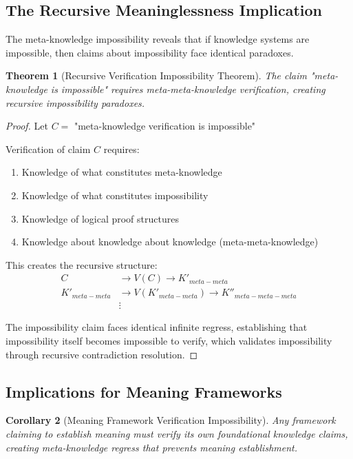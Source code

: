 \documentclass[12pt,a4paper]{article}
\newtheorem{theorem}{Theorem}[section]
\newtheorem{corollary}[theorem]{Corollary}
\begin{document}
\subsection{The Recursive Meaninglessness Implication}

The meta-knowledge impossibility reveals that if knowledge systems are impossible, then claims about impossibility face identical paradoxes.

\begin{theorem}[Recursive Verification Impossibility Theorem]
The claim "meta-knowledge is impossible" requires meta-meta-knowledge verification, creating recursive impossibility paradoxes.
\end{theorem}

\begin{proof}
Let $C =$ "meta-knowledge verification is impossible"

Verification of claim $C$ requires:
\begin{enumerate}
\item Knowledge of what constitutes meta-knowledge
\item Knowledge of what constitutes impossibility
\item Knowledge of logical proof structures
\item Knowledge about knowledge about knowledge (meta-meta-knowledge)
\end{enumerate}

This creates the recursive structure:
\begin{align}
C &\rightarrow V(C) \rightarrow K'_{meta-meta} \\
K'_{meta-meta} &\rightarrow V(K'_{meta-meta}) \rightarrow K''_{meta-meta-meta} \\
&\vdots
\end{align}

The impossibility claim faces identical infinite regress, establishing that impossibility itself becomes impossible to verify, which validates impossibility through recursive contradiction resolution.
\end{proof}

\subsection{Implications for Meaning Frameworks}

\begin{corollary}[Meaning Framework Verification Impossibility]
Any framework claiming to establish meaning must verify its own foundational knowledge claims, creating meta-knowledge regress that prevents meaning establishment.
\end{corollary}
\end{document}
